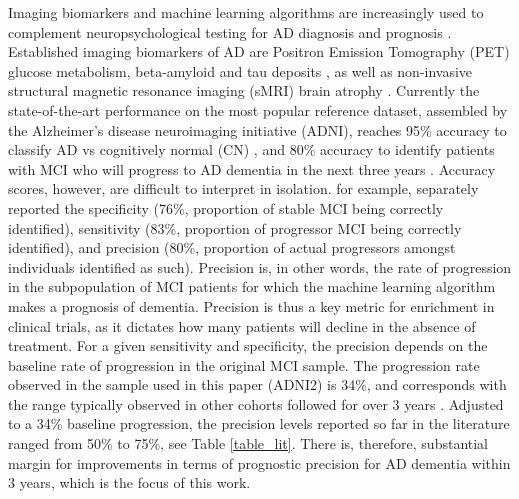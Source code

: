 \documentclass[authoryear]{elsarticle}
\begin{document}
Imaging biomarkers and machine learning algorithms are increasingly used to complement neuropsychological testing for AD diagnosis and prognosis \citep{Dubois2007,Rathore2017review}. Established imaging biomarkers of AD are Positron Emission Tomography (PET) glucose metabolism, beta-amyloid and tau deposits \citep{Fodero2011,Sperling2011}, as well as non-invasive structural magnetic resonance imaging (sMRI) brain atrophy \citep{Lerch2005a}. Currently the state-of-the-art performance on the most popular reference dataset, assembled by the Alzheimer's disease neuroimaging initiative (ADNI), reaches 95\% accuracy to classify AD vs cognitively normal (CN) \citep{Fan2008a,Zhu2014,Xu2015,Zu2016}, and 80\% accuracy to identify patients with MCI who will progress to AD dementia in the next three years \citep{Mathotaarachchi2017,Moradi2015,Eskildsen2013,Wee2013,Gaser2013,Davatzikos2011,Koikkalainen2011,Misra2009}. Accuracy scores, however, are difficult to interpret in isolation. \cite{Korolev2016} for example, separately reported the specificity (76\%, proportion of stable MCI being correctly identified), sensitivity (83\%, proportion of progressor MCI being correctly identified), and precision (80\%, proportion of actual progressors amongst individuals identified as such). Precision is, in other words, the rate of progression in the subpopulation of MCI patients for which the machine learning algorithm makes a prognosis of dementia. Precision is thus a key metric for enrichment in clinical trials, as it dictates how many patients will decline in the absence of treatment. For a given sensitivity and specificity, the precision depends on the baseline rate of progression in the original MCI sample. The progression rate observed in the sample used in this paper (ADNI2) is 34\%, and corresponds with the range typically observed in other cohorts followed for over 3 years \citep{Ward2013}. Adjusted to a 34\% baseline progression, the precision levels reported so far in the literature ranged from 50\% to 75\%, see Table \ref{table_lit}. There is, therefore, substantial margin for improvements in terms of prognostic precision for AD dementia within 3 years, which is the focus of this work. 
\end{document}
